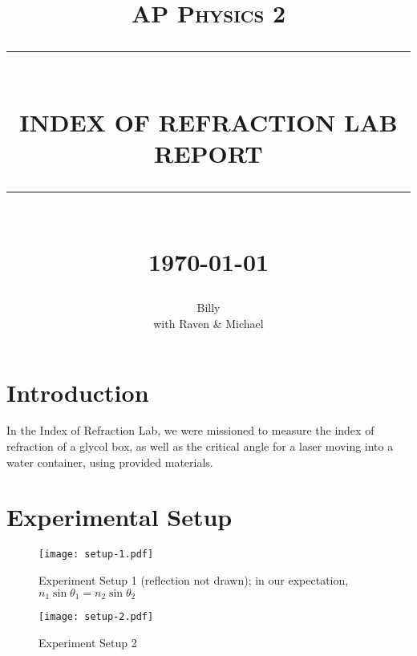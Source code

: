 \documentclass{elegantpaper}
\newcommand{\HRule}[1]{\rule{\linewidth}{#1}}
\begin{document}
\title{ \normalsize \textsc{AP Physics 2}
		\\ [2.0cm]
		\HRule{0.5pt} \\
		\LARGE \textbf{\uppercase{Index of Refraction Lab Report}}
		\HRule{2pt} \\ [0.5cm]
		\normalsize \today \vspace*{5\baselineskip}}

\date{}

\author{
		Billy \\ 
		with Raven \& Michael}

\maketitle

\clearpage

\section{Introduction}
In the Index of Refraction Lab, we were missioned to measure the index of refraction of a glycol box, as well as the critical angle for a laser moving into a water container, using provided materials.

\section{Experimental Setup}
\begin{figure}[!ht]
	\centering
	\texttt{[image: setup-1.pdf]}
	\caption{Experiment Setup 1 (reflection not drawn); in our expectation, $n_1\sin{\theta_1}=n_2\sin{\theta_2}$}
	\centering
  \label{label:Setup}
\end{figure}

\begin{figure}[!ht]
	\centering
	\texttt{[image: setup-2.pdf]}
	\caption{Experiment Setup 2}
	\centering
  \label{label:Setup}
\end{figure}
\clearpage
\end{document}
